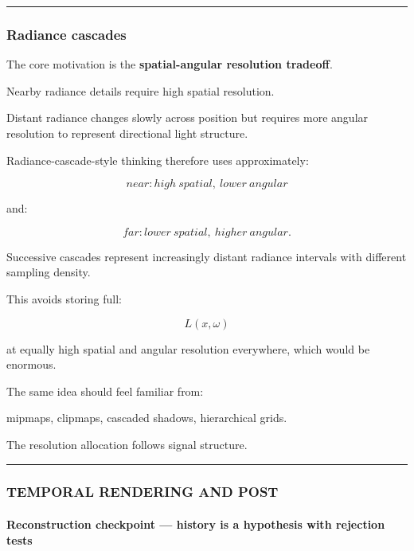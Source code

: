 \begin{center}\rule{0.5\linewidth}{0.5pt}\end{center}

\subsubsection{Radiance cascades}\label{radiance-cascades}

The core motivation is the \textbf{spatial-angular resolution tradeoff}.

Nearby radiance details require high spatial resolution.

Distant radiance changes slowly across position but requires more angular resolution to represent directional light structure.

Radiance-cascade-style thinking therefore uses approximately:

\[
\boxed{
near:
high\ spatial,\ lower\ angular
}
\]

and:

\[
\boxed{
far:
lower\ spatial,\ higher\ angular.
}
\]

Successive cascades represent increasingly distant radiance intervals with different sampling density.

This avoids storing full:

\[
L(x,\omega)
\]

at equally high spatial and angular resolution everywhere, which would be enormous.

The same idea should feel familiar from:

mipmaps, clipmaps, cascaded shadows, hierarchical grids.

The resolution allocation follows signal structure.

\begin{center}\rule{0.5\linewidth}{0.5pt}\end{center}

\subsubsection{TEMPORAL RENDERING AND POST}\label{temporal-rendering-and-post}

\paragraph{Reconstruction checkpoint --- history is a hypothesis with rejection tests}\label{reconstruction-checkpoint-history-is-a-hypothesis-with-rejection-tests}

